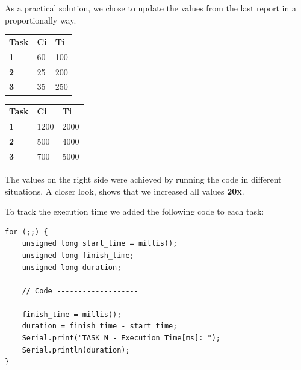 \documentclass[11pt]{article}
\begin{document}
As a practical solution, we chose to update the values from the last report in a proportionally way.
 
\begin{table}[H]
    \caption{Theoretical values (left) and implemented values (right) in \textit{ms}:}
    \begin{minipage}{0.7\linewidth}
		\begin{table}[H]
		\begin{tabular}{lll}
		\textbf{Task} & \textbf{Ci} & \textbf{Ti} \\
		\textbf{1}    & 60         & 100           \\
		\textbf{2}    & 25         & 200           \\
		\textbf{3}    & 35         & 250          
		\end{tabular}
		\label{table:rt-1}
		\end{table}
    \end{minipage}%
    \begin{minipage}{.5\linewidth}
		\begin{table}[H]
		\begin{tabular}{lll}
		\textbf{Task} & \textbf{Ci} & \textbf{Ti} \\
		\textbf{1}    & 1200         & 2000           \\
		\textbf{2}    & 500         & 4000           \\
		\textbf{3}    & 700         & 5000          
		\end{tabular}
		\label{table:rt-2}
		\end{table}
    \end{minipage} 
\end{table}

The values on the right side were achieved by running the code in different situations. A closer look, shows that we increased all values \textbf{20x}.

To track the execution time we added the following code to each task:

\begin{verbatim}
for (;;) {
    unsigned long start_time = millis();
    unsigned long finish_time;
    unsigned long duration;

    // Code -------------------

    finish_time = millis();      
    duration = finish_time - start_time;
    Serial.print("TASK N - Execution Time[ms]: ");
    Serial.println(duration); 
}
\end{verbatim}
\end{document}
